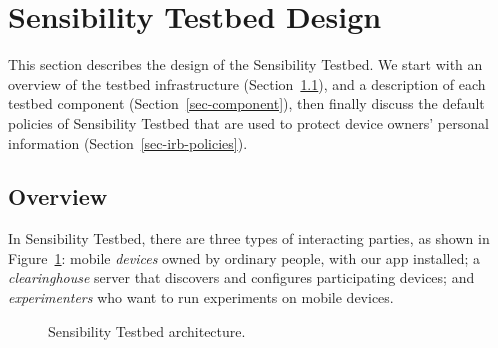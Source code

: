 \section{Sensibility Testbed Design}\label{sec-design}

This section describes the design of the Sensibility Testbed. 
We start with
an overview of the testbed infrastructure (Section~\ref{sec-overview}), 
and a description of each testbed component 
(Section~\ref{sec-component}), then finally discuss the default policies 
of Sensibility Testbed that are used to protect device owners' personal 
information (Section~\ref{sec-irb-policies}).


\subsection{Overview}\label{sec-overview}

In Sensibility Testbed, there are three types of interacting
parties, as shown in Figure~\ref{fig-arch}: mobile \textit{devices} 
owned by ordinary people, with our app installed; a 
\textit{clearinghouse} server that discovers and configures
participating devices; and \textit{experimenters} who want to run
experiments on mobile devices. 

\begin{figure}
\caption{\small Sensibility Testbed architecture. \label{fig-arch}}
\end{figure}

